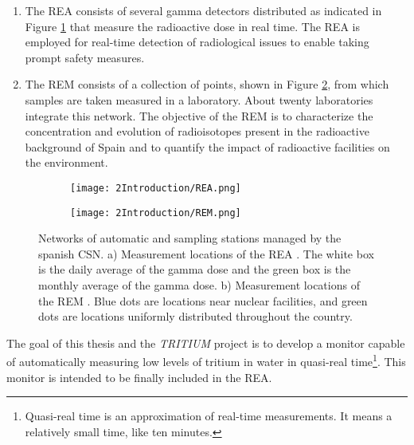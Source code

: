 \begin{enumerate}
\begin{enumerate}
\item{} The REA \cite{REA} consists of several gamma detectors distributed as indicated in Figure \ref{subfig:REA} that measure the radioactive dose in real time. The REA is employed for real-time detection of radiological issues to enable taking prompt safety measures.

\item{} The REM \cite{REM} consists of a collection of points, shown in Figure \ref{subfig:REM}, from which samples are taken measured in a laboratory. About twenty laboratories integrate this network. The objective of the REM is to characterize the concentration and evolution of radioisotopes present in the radioactive background of Spain and to quantify the impact of radioactive facilities on the environment.
\end{enumerate}

\begin{figure}
\centering
    \begin{subfigure}[b]{0.7\textwidth}
    \centering
    \texttt{[image: 2Introduction/REA.png]}  
        \caption{}\label{subfig:REA}
    \end{subfigure}
    \hfill
    \begin{subfigure}[b]{0.7\textwidth}
    \centering
    \texttt{[image: 2Introduction/REM.png]}  
    \caption{\label{subfig:REM}}
    \end{subfigure}
 \caption{Networks of automatic and sampling stations managed by the spanish CSN. a) Measurement locations of the REA \cite{REA}. The white box is the daily average of the gamma dose and the green box is the monthly average of the gamma dose. b) Measurement locations of the REM \cite{REM}. Blue dots are locations near nuclear facilities, and green dots are locations uniformly distributed throughout the country.}
 \label{fig:NetworksCSN}
\end{figure}


\end{enumerate}

The goal of this thesis and the \textit{TRITIUM} project is to develop a monitor capable of automatically measuring low levels of tritium in water in quasi-real time\footnote{Quasi-real time is an approximation of real-time measurements. It means a relatively small time, like ten minutes.}. This monitor is intended to be finally included in the REA.


